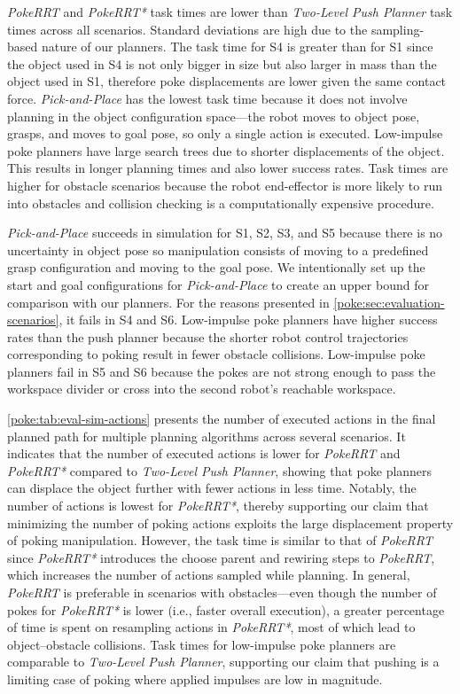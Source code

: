 \textsl{PokeRRT} and \textsl{PokeRRT*} task times are lower than \textsl{Two-Level Push Planner} task times across all scenarios. Standard deviations are high due to the sampling-based nature of our planners. The task time for S4 is greater than for S1 since the object used in S4 is not only bigger in size but also larger in mass than the object used in S1, therefore poke displacements are lower given the same contact force. \textsl{Pick-and-Place} has the lowest task time because it does not involve planning in the object configuration space---the robot moves to object pose, grasps, and moves to goal pose, so only a single action is executed. Low-impulse poke planners have large search trees due to shorter displacements of the object. This results in longer planning times and also lower success rates. Task times are higher for obstacle scenarios because the robot end-effector is more likely to run into obstacles and collision checking is a computationally expensive procedure.

\textsl{Pick-and-Place} succeeds in simulation for S1, S2, S3, and S5 because there is no uncertainty in object pose so manipulation consists of moving to a predefined grasp configuration and moving to the goal pose. We intentionally set up the start and goal configurations for \textsl{Pick-and-Place} to create an upper bound for comparison with our planners. For the reasons presented in \cref{poke:sec:evaluation-scenarios}, it fails in S4 and S6. Low-impulse poke planners have higher success rates than the push planner because the shorter robot control trajectories corresponding to poking result in fewer obstacle collisions. Low-impulse poke planners fail in S5 and S6 because the pokes are not strong enough to pass the workspace divider or cross into the second robot's reachable workspace.

\cref{poke:tab:eval-sim-actions} presents the number of executed actions in the final planned path for multiple planning algorithms across several scenarios. It indicates that the number of executed actions is lower for \textsl{PokeRRT} and \textsl{PokeRRT*} compared to \textsl{Two-Level Push Planner}, showing that poke planners can displace the object further with fewer actions in less time. Notably, the number of actions is lowest for \textsl{PokeRRT*}, thereby supporting our claim that minimizing the number of poking actions exploits the large displacement property of poking manipulation.
However, the task time is similar to that of \textsl{PokeRRT} since \textsl{PokeRRT*} introduces the choose parent and rewiring steps to \textsl{PokeRRT}, which increases the number of actions sampled while planning. In general, \textsl{PokeRRT} is preferable in scenarios with obstacles---even though the number of pokes for \textsl{PokeRRT*} is lower (i.e., faster overall execution), a greater percentage of time is spent on resampling actions in \textsl{PokeRRT*}, most of which lead to object--obstacle collisions. Task times for low-impulse poke planners are comparable to \textsl{Two-Level Push Planner}, supporting our claim that pushing is a limiting case of poking where applied impulses are low in magnitude.


